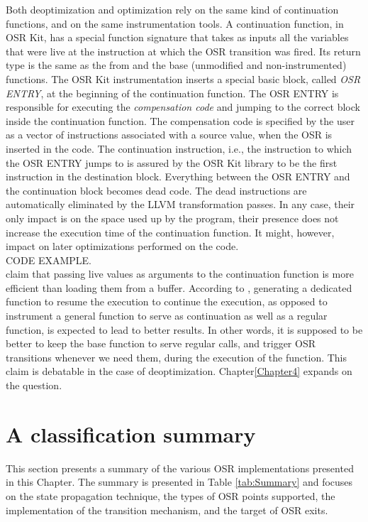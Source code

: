 Both deoptimization and optimization rely on the same kind of continuation functions, and on the same instrumentation tools.
A continuation function, in OSR Kit, has a special function signature that takes as inputs all the variables that were live at the instruction at which the OSR transition was fired.
Its return type is the same as the from and the base (unmodified and non-instrumented) functions.
The OSR Kit instrumentation inserts a special basic block, called \textit{OSR ENTRY}, at the beginning of the continuation function.
The OSR ENTRY is responsible for executing the \textit{compensation code} and jumping to the correct block inside the continuation function.
The compensation code is specified by the user as a vector of instructions associated with a source value, when the OSR is inserted in the code.
The continuation instruction, i.e., the instruction to which the OSR ENTRY jumps to is assured by the OSR Kit library to be the first instruction in the destination block.
Everything between the OSR ENTRY and the continuation block becomes dead code.
The dead instructions are automatically eliminated by the LLVM transformation passes.
In any case, their only impact is on the space used up by the program, their presence does not increase the execution time of the continuation function.
It might, however, impact on later optimizations performed on the code.\\

CODE EXAMPLE.\\

 claim that passing live values as arguments to the continuation function is more efficient than loading them from a buffer.
According to \cite{fink2003design}, generating a dedicated function to resume the execution to continue the execution, as opposed to instrument a general function to serve as continuation as well as a regular function, is expected to lead to better results.
In other words, it is supposed to be better to keep the base function to serve regular calls, and trigger OSR transitions whenever we need them, during the execution of the function.
This claim is debatable in the case of deoptimization.
Chapter\ref{Chapter4} expands on the question.\\

\section{A classification summary}
This section presents a summary of the various OSR implementations presented in this Chapter.
The summary is presented in Table \ref{tab:Summary} and focuses on the state propagation technique, the types of OSR points supported, the implementation of the transition mechanism, and the target of OSR exits.\\

